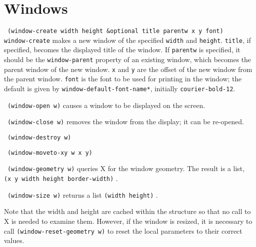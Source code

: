 \section{Windows}

{\tt \hspace*{0.5in} (window-create width height \&optional title parentw
 x y font)} \\

\vspace{-0.1in}
{\tt window-create} makes a new window of the specified {\tt width} and
{\tt height}.  {\tt title}, if specified, becomes the displayed title
of the window.  If {\tt parentw} is specified, it should be the
{\tt window-parent} property of an existing window, which becomes the parent
window of the new window.  {\tt x} and {\tt y} are the offset of the
new window from the parent window.  {\tt font} is the font to be used
for printing in the window; the default is given by
{\tt *window-default-font-name*}, initially {\tt courier-bold-12}.

{\tt \hspace*{0.5in} (window-open w)} causes a window to be displayed
on the screen.

{\tt \hspace*{0.5in} (window-close w)} removes the window from the display;
it can be re-opened.

{\tt \hspace*{0.5in} (window-destroy w)}

{\tt \hspace*{0.5in} (window-moveto-xy w x y)}

{\tt \hspace*{0.5in} (window-geometry w)} queries X for the window geometry.
The result is a list, \linebreak
{\tt (x y width height border-width)} .

{\tt \hspace*{0.5in} (window-size w)} returns a list {\tt (width height)} .

\vspace{-0.1in}
Note that the width and height are cached within the structure so that no call
to X is needed to examine them.  However, if the window is resized, it is
necessary to call {\tt (window-reset-geometry\ w)} to reset the local
parameters to their correct values.

%
%

